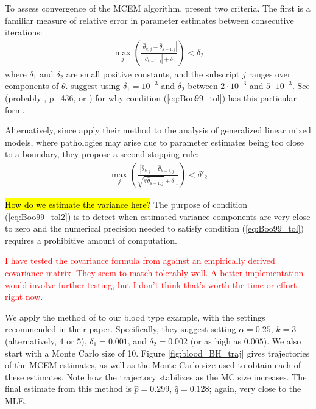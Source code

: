 \documentclass[11pt, oneside]{article}   	%
\newcommand{\bV}{\mathbb{V}}
\begin{document}
To assess convergence of the MCEM algorithm, \citeauthor{Boo99} present two criteria. The first is a familiar measure of relative error in parameter estimates between consecutive iterations:
%
\begin{align}
    \max_j \left( \frac{\left| \hat{\theta}_{k, j} - \hat{\theta}_{k-1,j} \right|}{\left| \hat{\theta}_{k-1,j} \right| + \delta_1} \right) < \delta_2 \label{eq:Boo99_tol}
\end{align}
%
where $\delta_1$ and $\delta_2$ are small positive constants, and the subscript $j$ ranges over components of $\theta$. \citeauthor{Boo99} suggest using $\delta_1 = 10^{-3}$ and $\delta_2$ between $2 \cdot 10^{-3}$ and $5 \cdot 10^{-3}$. See \citep{need} (probably \citealp{Sea06}, p.\ 436, or \citealp{Mar63}) for why condition (\ref{eq:Boo99_tol}) has this particular form.

Alternatively, since \citeauthor{Boo99} apply their method to the analysis of generalized linear mixed models, where pathologies may arise due to parameter estimates being too close to a boundary, they propose a second stopping rule:
%
\begin{align}
    \max_j \left( \frac{\left| \hat{\theta}_{k, j} - \hat{\theta}_{k-1,j} \right|}{\sqrt{\bV \hat{\theta}_{k-1,j}} + \delta'_1} \right) < \delta'_2 \label{eq:Boo99_tol2}
\end{align}

\hl{How do we estimate the variance here?} The purpose of condition (\ref{eq:Boo99_tol2}) is to detect when estimated variance components are very close to zero and the numerical precision needed to satisfy condition (\ref{eq:Boo99_tol}) requires a prohibitive amount of computation.


\textcolor{red}{I have tested the covariance formula from \citet{Boo99} against an empirically derived covariance matrix. They seem to match tolerably well. A better implementation would involve further testing, but I don't think that's worth the time or effort right now.}

We apply the method of \citet{Boo99} to our blood type example, with the settings recommended in their paper. Specifically, they suggest setting $\alpha = 0.25$, $k = 3$ (alternatively, $4$ or $5$), $\delta_1 = 0.001$, and $\delta_2 = 0.002$ (or as high as $0.005$). We also start with a Monte Carlo size of 10. Figure \ref{fig:blood_BH_traj} gives trajectories of the MCEM estimates, as well as the Monte Carlo size used to obtain each of these estimates. Note how the trajectory stabilizes as the MC size increases. The final estimate from this method is $\hat{p} = 0.299$, $\hat{q} = 0.128$; again, very close to the MLE.
\end{document}
